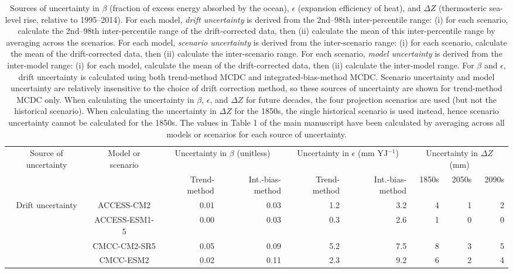 \begin{table*}[t]
\centering
\caption{Sources of uncertainty in $\beta$ (fraction of excess energy absorbed by the ocean), $\epsilon$ (expansion efficiency of heat), and ${\Delta}Z$ (thermosteric sea-level rise, relative to 1995--2014). For each model, \emph{drift uncertainty} is derived from the 2nd--98th inter-percentile range: (i) for each scenario, calculate the 2nd--98th inter-percentile range of the drift-corrected data, then (ii) calculate the mean of this inter-percentile range by averaging across the scenarios. For each model, \emph{scenario uncertainty} is derived from the inter-scenario range: (i) for each scenario, calculate the mean of the drift-corrected data, then (ii) calculate the inter-scenario range. For each scenario, \emph{model uncertainty} is derived from the inter-model range: (i) for each model, calculate the mean of the drift-corrected data, then (ii) calculate the inter-model range. For $\beta$ and $\epsilon$, drift uncertainty is calculated using both trend-method MCDC and integrated-bias-method MCDC. Scenario uncertainty and model uncertainty are relatively insensitive to the choice of drift correction method, so these sources of uncertainty are shown for trend-method MCDC only. When calculating the uncertainty in $\beta$, $\epsilon$, and ${\Delta}Z$ for future decades, the four projection scenarios are used (but not the historical scenario). When calculating the uncertainty in ${\Delta}Z$ for the 1850s, the single historical scenario is used instead, hence scenario uncertainty cannot be calculated for the 1850s. The values in Table 1 of the main manuscript have been calculated by averaging across all models or scenarios for each source of uncertainty.}
\begin{tabular}{c|c|rr|rr|rrr}
\toprule
Source of uncertainty & Model or scenario & \multicolumn{2}{c|}{Uncertainty in $\beta$ (unitless)} & \multicolumn{2}{c|}{Uncertainty in $\epsilon$ (mm YJ$^{-1}$)} & \multicolumn{3}{c}{Uncertainty in ${\Delta}Z$ (mm)} \\
 &  & Trend-method & Int.-bias-method & Trend-method & Int.-bias-method & 1850s & 2050s & 2090s \\
\midrule
\multirow[c]{16}{*}{Drift uncertainty} & ACCESS-CM2 & 0.01 & 0.03 & 1.2 & 3.2 & 4 & 1 & 2 \\
 & ACCESS-ESM1-5 & 0.00 & 0.03 & 0.3 & 2.6 & 1 & 0 & 0 \\
 & CMCC-CM2-SR5 & 0.05 & 0.09 & 5.2 & 7.5 & 8 & 3 & 5 \\
 & CMCC-ESM2 & 0.02 & 0.11 & 2.3 & 9.2 & 6 & 2 & 4 \\

\end{tabular}
\end{table*}
